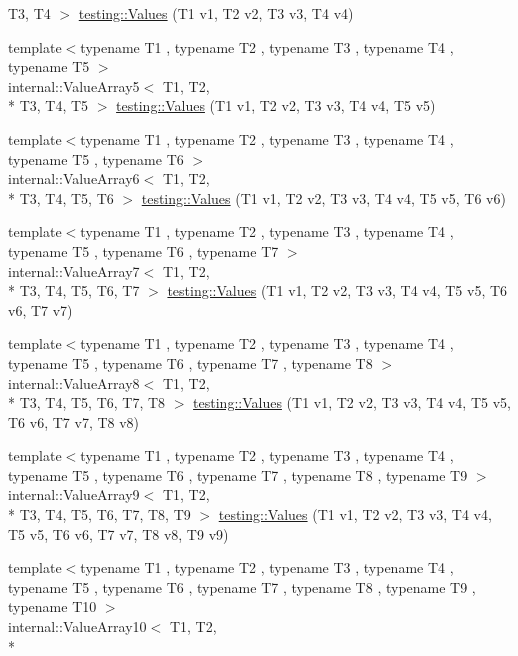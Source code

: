 \begin{DoxyCompactItemize}
T3, T4 $>$ \hyperlink{namespacetesting_a4b14d4b6e471a1fb8ee3e5706dbc11c6}{testing\-::\-Values} (T1 v1, T2 v2, T3 v3, T4 v4)
\item 
{\footnotesize template$<$typename T1 , typename T2 , typename T3 , typename T4 , typename T5 $>$ }\\internal\-::\-Value\-Array5$<$ T1, T2, \\*
T3, T4, T5 $>$ \hyperlink{namespacetesting_aa2c5f97a44a14ae95da8313b115b6396}{testing\-::\-Values} (T1 v1, T2 v2, T3 v3, T4 v4, T5 v5)
\item 
{\footnotesize template$<$typename T1 , typename T2 , typename T3 , typename T4 , typename T5 , typename T6 $>$ }\\internal\-::\-Value\-Array6$<$ T1, T2, \\*
T3, T4, T5, T6 $>$ \hyperlink{namespacetesting_a552772c4c4daa68b5e995e0d64651150}{testing\-::\-Values} (T1 v1, T2 v2, T3 v3, T4 v4, T5 v5, T6 v6)
\item 
{\footnotesize template$<$typename T1 , typename T2 , typename T3 , typename T4 , typename T5 , typename T6 , typename T7 $>$ }\\internal\-::\-Value\-Array7$<$ T1, T2, \\*
T3, T4, T5, T6, T7 $>$ \hyperlink{namespacetesting_a8fe9ae088304ebc64de1b076951e6eb8}{testing\-::\-Values} (T1 v1, T2 v2, T3 v3, T4 v4, T5 v5, T6 v6, T7 v7)
\item 
{\footnotesize template$<$typename T1 , typename T2 , typename T3 , typename T4 , typename T5 , typename T6 , typename T7 , typename T8 $>$ }\\internal\-::\-Value\-Array8$<$ T1, T2, \\*
T3, T4, T5, T6, T7, T8 $>$ \hyperlink{namespacetesting_a1eda12e6518e4c51c1bb2e7cc9d31ffa}{testing\-::\-Values} (T1 v1, T2 v2, T3 v3, T4 v4, T5 v5, T6 v6, T7 v7, T8 v8)
\item 
{\footnotesize template$<$typename T1 , typename T2 , typename T3 , typename T4 , typename T5 , typename T6 , typename T7 , typename T8 , typename T9 $>$ }\\internal\-::\-Value\-Array9$<$ T1, T2, \\*
T3, T4, T5, T6, T7, T8, T9 $>$ \hyperlink{namespacetesting_ab663e13807ad5cc223814797c9191a58}{testing\-::\-Values} (T1 v1, T2 v2, T3 v3, T4 v4, T5 v5, T6 v6, T7 v7, T8 v8, T9 v9)
\item 
{\footnotesize template$<$typename T1 , typename T2 , typename T3 , typename T4 , typename T5 , typename T6 , typename T7 , typename T8 , typename T9 , typename T10 $>$ }\\internal\-::\-Value\-Array10$<$ T1, T2, \\*

\end{DoxyCompactItemize}
